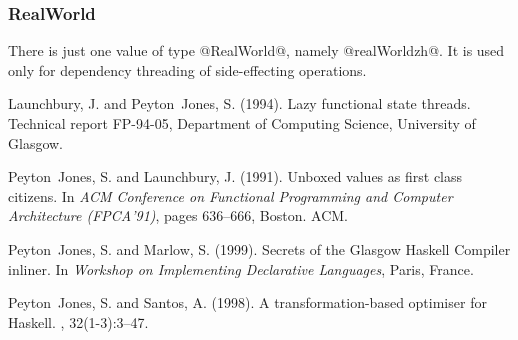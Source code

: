 \documentclass[10pt]{article}
\begin{document}
\newcommand{\primopdesc}[8]{
\par\noindent{\texttt{{{#3} :: {#6}}}}
\\{#7} {#8}\\} 



\subsubsection{RealWorld}

There is just one value of type @RealWorld@, namely @realWorldzh@. It is used
only for dependency threading of side-effecting operations.

\begin{thebibliography}{}

Launchbury, J. and {Peyton~Jones}, S. (1994).
\newblock Lazy functional state threads.
\newblock Technical report FP-94-05, Department of Computing Science,
  University of Glasgow.

{Peyton~Jones}, S. and Launchbury, J. (1991).
\newblock Unboxed values as first class citizens.
\newblock In {\em ACM Conference on Functional Programming and Computer
  Architecture (FPCA'91)}, pages 636--666, Boston. ACM.

{Peyton~Jones}, S. and Marlow, S. (1999).
\newblock Secrets of the {Glasgow Haskell Compiler} inliner.
\newblock In {\em Workshop on Implementing Declarative Languages}, Paris,
  France.

Peyton~Jones, S. and Santos, A. (1998).
\newblock A transformation-based optimiser for {Haskell}.
, 32(1-3):3--47.

\end{thebibliography}
\end{document}
